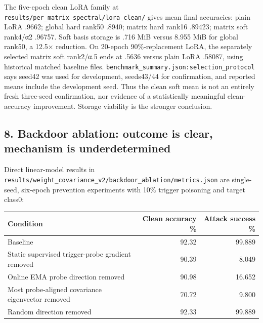 \documentclass[
  british,
  10pt,
  a4paper,
]{article}
\newcounter{none} %
\begin{document}
The five-epoch clean LoRA family at
\texttt{results/\allowbreak{}per\_\allowbreak{}matrix\_\allowbreak{}spectral/\allowbreak{}lora\_\allowbreak{}clean/\allowbreak{}}
gives mean final accuracies: plain LoRA .9662; global hard rank50 .8940;
matrix hard rank16 .89423; matrix soft rank4/α2 .96757. Soft basis
storage is .716 MiB versus 8.955 MiB for global rank50, a 12.5×
reduction. On 20-epoch 90\%-\allowbreak{}replacement LoRA, the
separately selected matrix soft rank2/α.5 ends at .5636 versus plain
LoRA .58087, using historical matched baseline files.
\texttt{benchmark\_\allowbreak{}summary.\allowbreak{}json:\allowbreak{}selection\_\allowbreak{}protocol}
says seed42 was used for development,\allowbreak{} seeds43/44 for
confirmation\allowbreak{},\allowbreak{} and reported means include the
development seed. Thus the clean soft mean is not an entirely fresh
three-seed confirmation\allowbreak{},\allowbreak{} nor evidence of a
statistically meaningful clean-\allowbreak{}accuracy
improvement.\allowbreak{} Storage viability is the stronger
conclusion.\allowbreak{}

\subsection{8. Backdoor ablation: outcome is clear, mechanism is
underdetermined}\label{classical-evidence--backdoor-ablation-outcome-is-clear-mechanism-is-underdetermined}

Direct linear-\allowbreak{}model results in
\texttt{results/\allowbreak{}weight\_\allowbreak{}covariance\_\allowbreak{}v2/\allowbreak{}backdoor\_\allowbreak{}ablation/\allowbreak{}metrics.\allowbreak{}json}
are single-\allowbreak{}seed,\allowbreak{} six-epoch prevention
experiments with 10\% trigger poisoning and target class0:

{\def\LTcaptype{none} %
\begin{longtable}[]{@{}lrr@{}}
\toprule\noalign{}
Condition & Clean accuracy \% & Attack success \% \\
\midrule\noalign{}
\endhead
\bottomrule\noalign{}
\endlastfoot
Baseline & 92.32 & 99.889 \\
Static supervised trigger-\allowbreak{}probe gradient removed & 90.39 &
8.049 \\
Online EMA probe direction removed & 90.98 & 16.652 \\
Most probe-\allowbreak{}aligned covariance eigenvector removed & 70.72 &
9.800 \\
Random direction removed & 92.33 & 99.889 \\
\end{longtable}
}
\end{document}
